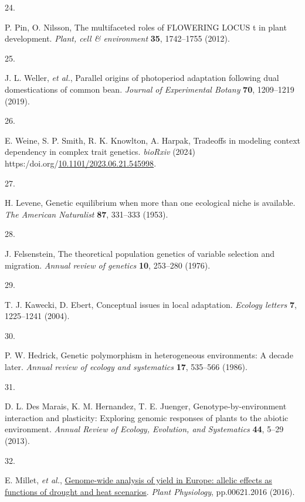 \documentclass[
  9pt,
  twocolumn,
  twoside]{pnas-new}
\newlength{\cslhangindent}
\newlength{\csllabelwidth}
\newenvironment{CSLReferences}[2] %
 {\begin{list}{}{%
  \setlength{\itemindent}{0pt}
  \setlength{\leftmargin}{0pt}
  \setlength{\parsep}{0pt}
  \ifodd #1
   \setlength{\leftmargin}{\cslhangindent}
   \setlength{\itemindent}{-1\cslhangindent}
  \fi
  \setlength{\itemsep}{#2\baselineskip}}}
 {\end{list}}
\newcommand{\CSLLeftMargin}[1]{\parbox[t]{\csllabelwidth}{\strut#1\strut}}
\newcommand{\CSLRightInline}[1]{\parbox[t]{\linewidth - \csllabelwidth}{\strut#1\strut}}
\begin{document}
\begin{CSLReferences}{0}{1}
\CSLLeftMargin{24. }%
\CSLRightInline{P. Pin, O. Nilsson, The multifaceted roles of FLOWERING
LOCUS t in plant development. \emph{Plant, cell \& environment}
\textbf{35}, 1742--1755 (2012).}

\CSLLeftMargin{25. }%
\CSLRightInline{J. L. Weller, \emph{et al.}, Parallel origins of
photoperiod adaptation following dual domestications of common bean.
\emph{Journal of Experimental Botany} \textbf{70}, 1209--1219 (2019).}

\CSLLeftMargin{26. }%
\CSLRightInline{E. Weine, S. P. Smith, R. K. Knowlton, A. Harpak,
Tradeoffs in modeling context dependency in complex trait genetics.
\emph{bioRxiv} (2024)
https:/doi.org/\href{https://doi.org/10.1101/2023.06.21.545998}{10.1101/2023.06.21.545998}.}

\CSLLeftMargin{27. }%
\CSLRightInline{H. Levene, Genetic equilibrium when more than one
ecological niche is available. \emph{The American Naturalist}
\textbf{87}, 331--333 (1953).}

\CSLLeftMargin{28. }%
\CSLRightInline{J. Felsenstein, The theoretical population genetics of
variable selection and migration. \emph{Annual review of genetics}
\textbf{10}, 253--280 (1976).}

\CSLLeftMargin{29. }%
\CSLRightInline{T. J. Kawecki, D. Ebert, Conceptual issues in local
adaptation. \emph{Ecology letters} \textbf{7}, 1225--1241 (2004).}

\CSLLeftMargin{30. }%
\CSLRightInline{P. W. Hedrick, Genetic polymorphism in heterogeneous
environments: A decade later. \emph{Annual review of ecology and
systematics} \textbf{17}, 535--566 (1986).}

\CSLLeftMargin{31. }%
\CSLRightInline{D. L. Des Marais, K. M. Hernandez, T. E. Juenger,
Genotype-by-environment interaction and plasticity: Exploring genomic
responses of plants to the abiotic environment. \emph{Annual Review of
Ecology, Evolution, and Systematics} \textbf{44}, 5--29 (2013).}

\CSLLeftMargin{32. }%
\CSLRightInline{E. Millet, \emph{et al.},
\href{https://doi.org/10.1104/pp.16.00621}{Genome-wide analysis of yield
in Europe: allelic effects as functions of drought and heat scenarios}.
\emph{Plant Physiology}, pp.00621.2016 (2016).}


\end{CSLReferences}
\end{document}
